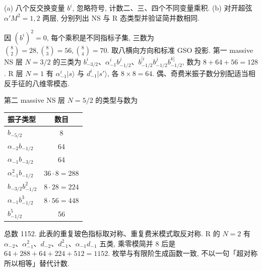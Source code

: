 \begin{exercise}
(a) 八个反交换变量 $b^i$, 忽略符号, 计数二、三、四个不同变量乘积.
(b) 对开超弦 $\alpha'M^2=1,2$ 两层, 分别列出 NS 与 R 态类型并验证简并数相同.
\end{exercise}
\begin{solution}
因 $(b^i)^2=0$, 每个乘积是不同指标子集, 三数为 $\binom82=28,\binom83=56,\binom84=70$.
取八横向方向和标准 GSO 投影. 第一 massive NS 层 $N=3/2$ 的三类为 $b_{-3/2}^i$、$\alpha_{-1}^ib_{-1/2}^j$、$b_{-1/2}^{[i}b_{-1/2}^jb_{-1/2}^{k]}$, 数为 $8+64+56=128$. R 层 $N=1$ 有 $\alpha_{-1}^i|s\rangle$ 与 $d_{-1}^i|s'\rangle$, 各 $8\times8=64$. 偶、奇费米振子数分别配适当相反手征的八维零模态.

第二 massive NS 层 $N=5/2$ 的类型与数为
\begin{center}\begin{tabular}{lc}\toprule
振子类型 & 数目\\\midrule
$b_{-5/2}$ & 8\\
$\alpha_{-2}b_{-1/2}$ &64\\
$\alpha_{-1}b_{-3/2}$ &64\\
$\alpha_{-1}^2b_{-1/2}$ &$36\cdot8=288$\\
$b_{-3/2}b_{-1/2}^2$ &$8\cdot28=224$\\
$\alpha_{-1}b_{-1/2}^3$ &$8\cdot56=448$\\
$b_{-1/2}^5$ &56\\\bottomrule
\end{tabular}\end{center}
总数 1152. 此表的重复玻色指标取对称、重复费米模式取反对称. R 的 $N=2$ 有 $\alpha_{-2}$、$\alpha_{-1}^2$、$d_{-2}$、$d_{-1}^2$、$\alpha_{-1}d_{-1}$ 五类, 乘零模简并 8 后是 $64+288+64+224+512=1152$. 枚举与有限阶生成函数一致, 不以一句「超对称所以相等」替代计数.
\end{solution}

